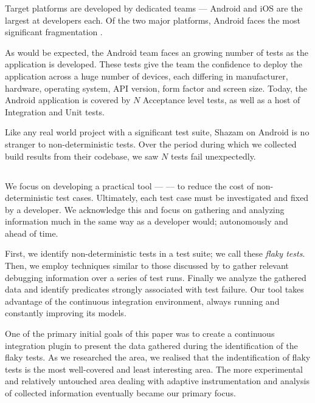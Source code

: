 Target platforms are developed by dedicated teams --- Android and iOS are the largest at  developers each. Of the two major platforms, Android faces the most significant fragmentation \cite{AndroidFragmentationVisualized}.

As would be expected, the Android team faces an growing number of tests as the application is developed.  These tests give the team the confidence to deploy the application across a huge number of devices, each differing in manufacturer, hardware, operating system, API version, form factor and screen size. Today, the Android application is covered by $N$  Acceptance level tests, as well as a host of Integration and Unit tests.

Like any real world project with a significant test suite, Shazam on Android is no stranger to non-deterministic tests. Over the period  during which we collected build results from their codebase, we saw $N$ tests fail unexpectedly.

\subsection{\splatter}

We focus on developing a practical tool --- \emph{\splatter} --- to reduce the cost of non-deterministic test cases. Ultimately, each test case must be investigated and fixed by a developer. We acknowledge this and focus on gathering and analyzing information much in the same way as a developer would; autonomously and ahead of time.

First, we identify non-deterministic tests in a test suite; we call these \textit{flaky tests}. Then, we employ techniques similar to those discussed by \citet{ArumugaNainar:2010:ABI:1806799.1806839} to gather relevant debugging information over a series of test runs. Finally we analyze the gathered data and identify predicates strongly associated with test failure. Our tool takes advantage of the continuous integration environment, always running and constantly improving its models.

One of the primary initial goals of this paper was to create a continuous integration plugin to present the data gathered during the identification of the flaky tests. As we researched the area, we realised that the indentification of flaky tests is the most well-covered and least interesting area. The more experimental and relatively untouched area dealing with adaptive instrumentation and analysis of collected information eventually became our primary focus.

